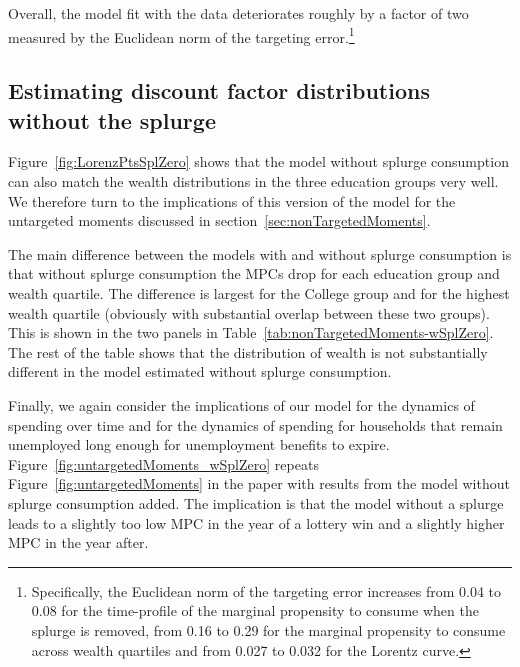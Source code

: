 \documentclass[\PathToRoot/\ProjectName]{subfiles}
\begin{document}
Overall, the model fit with the data deteriorates roughly by a factor of two measured by the Euclidean norm of the targeting error.\footnote{Specifically, the Euclidean norm of the targeting error increases from 0.04 to 0.08 for the time-profile of the marginal propensity to consume when the splurge is removed, from 0.16 to 0.29 for the marginal propensity to consume across wealth quartiles and from 0.027 to 0.032 for the Lorentz curve.}



\subsection{Estimating discount factor distributions without the splurge}

Figure~\ref{fig:LorenzPtsSplZero} shows that the model without splurge consumption can also match the wealth distributions in the three education groups very well. We therefore turn to the implications of this version of the model for the untargeted moments discussed in section~\ref{sec:nonTargetedMoments}.



The main difference between the models with and without splurge consumption is that without splurge consumption the MPCs drop for each education group and wealth quartile.
The difference is largest for the College group and for the highest wealth quartile (obviously with substantial overlap between these two groups). This is shown in the two panels in Table~\ref{tab:nonTargetedMoments-wSplZero}. The rest of the table shows that the distribution of wealth is not substantially different in the model estimated without splurge consumption.



Finally, we again consider the  implications of our model for the dynamics of spending over time and for the dynamics of spending for households that remain unemployed long enough for unemployment benefits to expire. Figure~\ref{fig:untargetedMoments_wSplZero} repeats Figure~\ref{fig:untargetedMoments} in the paper with results from the model without splurge consumption added. The implication is that the model without a splurge leads to a slightly too low MPC in the year of a lottery win and a slightly higher MPC in the year after.
\end{document}
